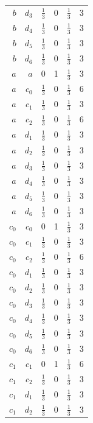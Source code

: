 \begin{longtable}{rrrrrr}
$b$ & $d_{3}$ & $\frac{1}{3}$ & 0 & $\frac{1}{3}$ & 3\\
$b$ & $d_{4}$ & $\frac{1}{3}$ & 0 & $\frac{1}{3}$ & 3\\
$b$ & $d_{5}$ & $\frac{1}{3}$ & 0 & $\frac{1}{3}$ & 3\\
$b$ & $d_{6}$ & $\frac{1}{3}$ & 0 & $\frac{1}{3}$ & 3\\
$a$ & $a$ & $0$ & 1 & $\frac{1}{3}$ & 3\\
$a$ & $c_{0}$ & $\frac{1}{3}$ & 0 & $\frac{1}{3}$ & 6\\
$a$ & $c_{1}$ & $\frac{1}{3}$ & 0 & $\frac{1}{3}$ & 3\\
$a$ & $c_{2}$ & $\frac{1}{3}$ & 0 & $\frac{1}{3}$ & 6\\
$a$ & $d_{1}$ & $\frac{1}{3}$ & 0 & $\frac{1}{3}$ & 3\\
$a$ & $d_{2}$ & $\frac{1}{3}$ & 0 & $\frac{1}{3}$ & 3\\
$a$ & $d_{3}$ & $\frac{1}{3}$ & 0 & $\frac{1}{3}$ & 3\\
$a$ & $d_{4}$ & $\frac{1}{3}$ & 0 & $\frac{1}{3}$ & 3\\
$a$ & $d_{5}$ & $\frac{1}{3}$ & 0 & $\frac{1}{3}$ & 3\\
$a$ & $d_{6}$ & $\frac{1}{3}$ & 0 & $\frac{1}{3}$ & 3\\
$c_{0}$ & $c_{0}$ & $0$ & 1 & $\frac{1}{3}$ & 3\\
$c_{0}$ & $c_{1}$ & $\frac{1}{3}$ & 0 & $\frac{1}{3}$ & 3\\
$c_{0}$ & $c_{2}$ & $\frac{1}{3}$ & 0 & $\frac{1}{3}$ & 6\\
$c_{0}$ & $d_{1}$ & $\frac{1}{3}$ & 0 & $\frac{1}{3}$ & 3\\
$c_{0}$ & $d_{2}$ & $\frac{1}{3}$ & 0 & $\frac{1}{3}$ & 3\\
$c_{0}$ & $d_{3}$ & $\frac{1}{3}$ & 0 & $\frac{1}{3}$ & 3\\
$c_{0}$ & $d_{4}$ & $\frac{1}{3}$ & 0 & $\frac{1}{3}$ & 3\\
$c_{0}$ & $d_{5}$ & $\frac{1}{3}$ & 0 & $\frac{1}{3}$ & 3\\
$c_{0}$ & $d_{6}$ & $\frac{1}{3}$ & 0 & $\frac{1}{3}$ & 3\\
$c_{1}$ & $c_{1}$ & $0$ & 1 & $\frac{1}{3}$ & 6\\
$c_{1}$ & $c_{2}$ & $\frac{1}{3}$ & 0 & $\frac{1}{3}$ & 3\\
$c_{1}$ & $d_{1}$ & $\frac{1}{3}$ & 0 & $\frac{1}{3}$ & 3\\
$c_{1}$ & $d_{2}$ & $\frac{1}{3}$ & 0 & $\frac{1}{3}$ & 3\\

\end{longtable}
